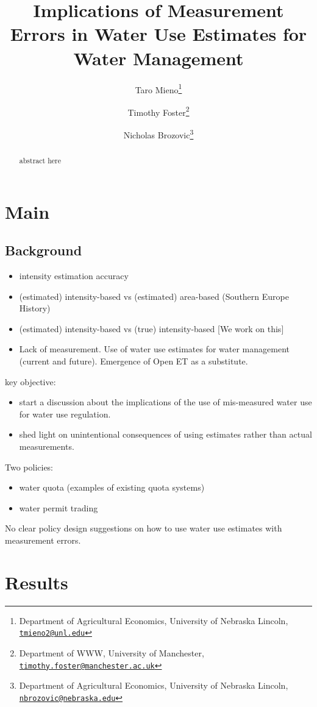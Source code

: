 \documentclass[
]{article}
\title{Implications of Measurement Errors in Water Use Estimates for Water Management}
\author{Taro Mieno\footnote{Department of Agricultural Economics, University of Nebraska Lincoln, \href{mailto:tmieno2@unl.edu}{\nolinkurl{tmieno2@unl.edu}}} \and Timothy Foster\footnote{Department of WWW, University of Manchester, \href{mailto:timothy.foster@manchester.ac.uk}{\nolinkurl{timothy.foster@manchester.ac.uk}}} \and Nicholas Brozovic\footnote{Department of Agricultural Economics, University of Nebraska Lincoln, \href{mailto:nbrozovic@nebraska.edu}{\nolinkurl{nbrozovic@nebraska.edu}}}}
\date{}
\providecommand{\tightlist}{%
  \setlength{\itemsep}{0pt}\setlength{\parskip}{0pt}}
\begin{document}
\maketitle
\begin{abstract}
abstract here
\end{abstract}

\newpage

\section{Main}\label{main}

\subsection{Background}\label{background}

\begin{itemize}
\item
  intensity estimation accuracy
\item
  (estimated) intensity-based vs (estimated) area-based (Southern Europe History)
\item
  (estimated) intensity-based vs (true) intensity-based {[}We work on this{]}
\item
  Lack of measurement. Use of water use estimates for water management (current and future). Emergence of Open ET as a substitute.
\end{itemize}

key objective:

\begin{itemize}
\item
  start a discussion about the implications of the use of mis-measured water use for water use regulation.
\item
  shed light on unintentional consequences of using estimates rather than actual measurements.
\end{itemize}

Two policies:

\begin{itemize}
\tightlist
\item
  water quota (examples of existing quota systems)
\item
  water permit trading
\end{itemize}

No clear policy design suggestions on how to use water use estimates with measurement errors.

\section{Results}\label{results}
\end{document}
